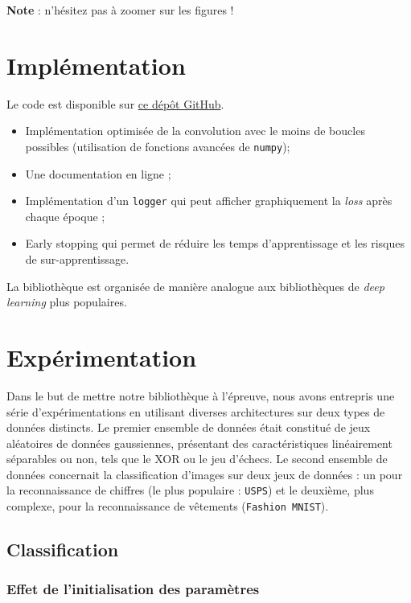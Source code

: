 \documentclass{article}
\begin{document}
\textbf{Note} : n'hésitez pas à zoomer sur les figures !

\section{Implémentation}

Le code est disponible sur \href{https://github.com/dataymeric/NeuralNetworksDIY}{ce dépôt GitHub}.

\begin{itemize}
    \item Implémentation optimisée de la convolution avec le moins de boucles possibles (utilisation de fonctions avancées de \texttt{numpy}); 
    \item Une documentation en ligne ;
    \item Implémentation d'un \texttt{logger} qui peut afficher graphiquement la \textit{loss} après chaque époque ; 
    \item Early stopping qui permet de réduire les temps d'apprentissage et les risques de sur-apprentissage.
\end{itemize}

La bibliothèque est organisée de manière analogue aux bibliothèques de \textit{deep learning} plus populaires.

\section{Expérimentation}

Dans le but de mettre notre bibliothèque à l'épreuve, nous avons entrepris une série d'expérimentations en utilisant diverses architectures sur deux types de données distincts. Le premier ensemble de données était constitué de jeux aléatoires de données gaussiennes, présentant des caractéristiques linéairement séparables ou non, tels que le XOR ou le jeu d'échecs. Le second ensemble de données concernait la classification d'images sur deux jeux de données : un pour la reconnaissance de chiffres (le plus populaire : \texttt{USPS}) et le deuxième, plus complexe, pour la reconnaissance de vêtements (\texttt{Fashion MNIST}).

\subsection{Classification}

\subsubsection{Effet de l'initialisation des paramètres}
\end{document}
